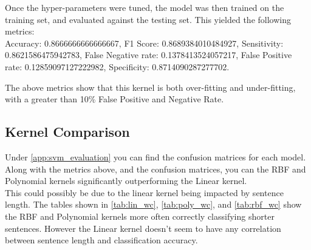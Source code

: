Once the hyper-parameters were tuned, the model was then trained on the training set, and evaluated against the testing set.
This yielded the following metrics:\\
Accuracy: 0.8666666666666667, 
F1 Score: 0.8689384010484927, 
Sensitivity: 0.8621586475942783, 
False Negative rate: 0.1378413524057217, 
False Positive rate: 0.12859097127222982, 
Specificity: 0.8714090287277702.

The above metrics show that this kernel is both over-fitting and under-fitting, with a greater than 10\% False Positive and Negative Rate.

\subsection{Kernel Comparison}
Under \autoref{app:svm_evaluation} you can find the confusion matrices for each model.\\
Along with the metrics above, and the confusion matrices, you can the RBF and Polynomial kernels significantly outperforming the Linear kernel.\\
This could possibly be due to the linear kernel being impacted by sentence length. The tables shown in \autoref{tab:lin_wc}, \autoref{tab:poly_wc}, and \autoref{tab:rbf_wc} show the RBF and Polynomial kernels more often correctly classifying shorter sentences. However the Linear kernel doesn't seem to have any correlation between sentence length and classification accuracy.

